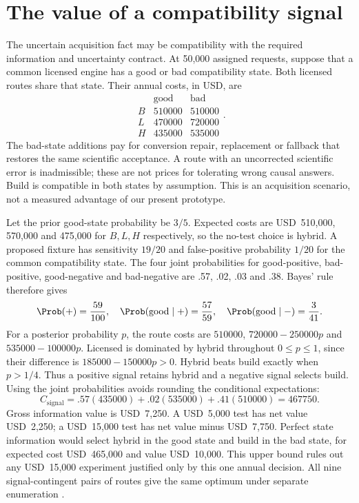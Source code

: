 \section{The value of a compatibility signal}
\label{exec17:s8-signal}

The uncertain acquisition fact may be compatibility with the required
information and uncertainty contract. At 50,000 assigned requests, suppose
that a common licensed engine has a good or bad compatibility state. Both
licensed routes share that state. Their annual costs, in USD, are
\begin{equation}
\begin{array}{c|rr}
 & \text{good} & \text{bad}\\ \hline
 B&510000&510000\\
 L&470000&720000\\
 H&435000&535000
\end{array}.
\label{exec17:s8-signal-cost-table}
\end{equation}
The bad-state additions pay for conversion repair, replacement or fallback
that restores the same scientific acceptance. A route with an uncorrected
scientific error is inadmissible; these are not prices for tolerating wrong
causal answers. Build is compatible in both states by assumption. This is an
acquisition scenario, not a measured advantage of our present prototype.

Let the prior good-state probability be $3/5$. Expected costs are USD~510,000,
570,000 and 475,000 for $B,L,H$ respectively, so the no-test choice is hybrid.
A proposed fixture has sensitivity $19/20$ and false-positive probability
$1/20$ for the common compatibility state. The four joint probabilities for
good-positive, bad-positive, good-negative and bad-negative are .57, .02, .03
and .38. Bayes' rule therefore gives
\begin{equation}
 \Prob(+)=\frac{59}{100},\quad
 \Prob(\mathrm{good}\mid +)=\frac{57}{59},\quad
 \Prob(\mathrm{good}\mid -)=\frac{3}{41}.
 \label{exec17:s8-signal-posterior}
\end{equation}
For a posterior probability $p$, the route costs are
$510000$, $720000-250000p$ and $535000-100000p$.
Licensed is dominated by hybrid throughout $0\leq p\leq1$, since their
difference is $185000-150000p>0$. Hybrid beats build exactly when $p>1/4$.
Thus a positive signal retains hybrid and a negative signal selects build.
Using the joint probabilities avoids rounding the conditional expectations:
\begin{equation}
 C_{\mathrm{signal}}=.57(435000)+.02(535000)+.41(510000)=467750.
 \label{exec17:s8-signal-value}
\end{equation}
Gross information value is USD~7,250. A USD~5,000 test has net value
USD~2,250; a USD~15,000 test has net value minus USD~7,750. Perfect state
information would select hybrid in the good state and build in the bad state,
for expected cost USD~465,000 and value USD~10,000. This upper bound rules out
any USD~15,000 experiment justified only by this one annual decision. All nine
signal-contingent pairs of routes give the same optimum under separate
enumeration \citep{exec17_s8_examples}.

